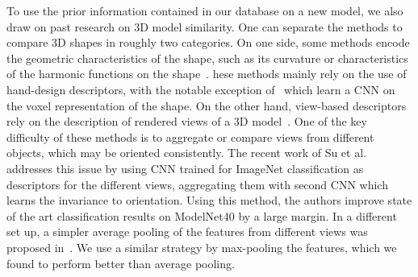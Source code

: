 To use the prior information contained in our database on a new model, we also draw on past research on 3D model similarity.
One can separate the methods to compare 3D shapes in roughly two categories.
On one side, some methods encode the geometric characteristics of the shape, such as its curvature or characteristics of the harmonic functions on the shape~\cite{horn1984extended, kazhdan2003rotation, bronstein2011shape}. 
hese methods mainly rely on the use of hand-design descriptors, with the notable exception of~\cite{wu20153d} which learn a CNN on the voxel representation of the shape.
On the other hand, view-based descriptors rely on the description of rendered views of a 3D model~\cite{murase1995visual,chen2003visual}.
One of the key difficulty of these methods is to aggregate or compare views from different objects, which may be oriented consistently.
The recent work of Su et al.~\cite{su2015multi} addresses this issue by using CNN trained for ImageNet classification as descriptors for the different views, aggregating them with second CNN which learns the invariance to orientation.
Using this method, the authors improve state of the art classification results on ModelNet40 by a large margin.
In a different set up, a simpler average pooling of the features from different views was proposed in~\cite{aubry2015understanding}.
We use a similar strategy by max-pooling the features, which we found to perform better than average pooling.

